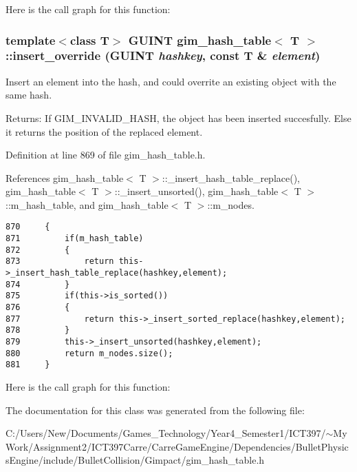Here is the call graph for this function:\hypertarget{classgim__hash__table_83987136757654921c71b183de8ec55e}{
\subsubsection[insert\_\-override]{\setlength{\rightskip}{0pt plus 5cm}template$<$class T$>$ GUINT {\bf gim\_\-hash\_\-table}$<$ T $>$::insert\_\-override (GUINT {\em hashkey}, \/  const T \& {\em element})}}
\label{classgim__hash__table_83987136757654921c71b183de8ec55e}


Insert an element into the hash, and could overrite an existing object with the same hash. 

\begin{Desc}
\item[Returns:]If GIM\_\-INVALID\_\-HASH, the object has been inserted succesfully. Else it returns the position of the replaced element. \end{Desc}


Definition at line 869 of file gim\_\-hash\_\-table.h.

References gim\_\-hash\_\-table$<$ T $>$::\_\-insert\_\-hash\_\-table\_\-replace(), gim\_\-hash\_\-table$<$ T $>$::\_\-insert\_\-unsorted(), gim\_\-hash\_\-table$<$ T $>$::m\_\-hash\_\-table, and gim\_\-hash\_\-table$<$ T $>$::m\_\-nodes.

\begin{Code}\begin{verbatim}870     {
871         if(m_hash_table)
872         {
873             return this->_insert_hash_table_replace(hashkey,element);
874         }
875         if(this->is_sorted())
876         {
877             return this->_insert_sorted_replace(hashkey,element);
878         }
879         this->_insert_unsorted(hashkey,element);
880         return m_nodes.size();
881     }
\end{verbatim}
\end{Code}




Here is the call graph for this function:

The documentation for this class was generated from the following file:\begin{CompactItemize}
\item 
C:/Users/New/Documents/Games\_\-Technology/Year4\_\-Semester1/ICT397/$\sim$My Work/Assignment2/ICT397Carre/CarreGameEngine/Dependencies/BulletPhysicsEngine/include/BulletCollision/Gimpact/gim\_\-hash\_\-table.h\end{CompactItemize}
